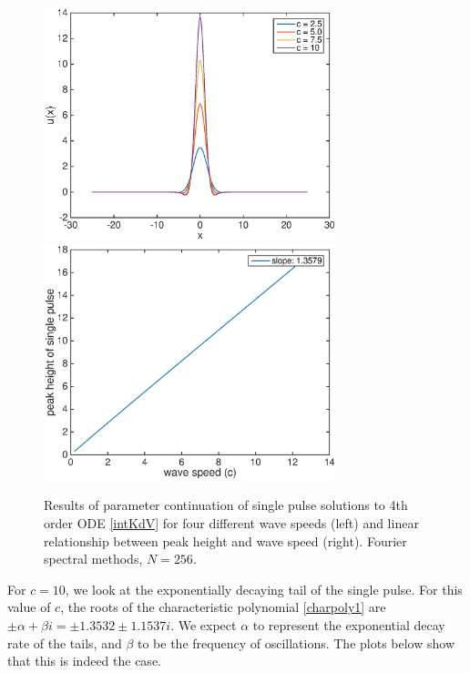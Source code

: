 \documentclass[12pt]{article}
\begin{document}
\begin{figure}[H]
	\includegraphics[width=8.5cm]{continuation.eps}
	\includegraphics[width=8.5cm]{heightvsspeed.eps}
	\caption{Results of parameter continuation of single pulse solutions to 4th order ODE \eqref{intKdV} for four different wave speeds (left) and linear relationship between peak height and wave speed (right). Fourier spectral methods, $N = 256$.}
\end{figure}

For $c = 10$, we look at the exponentially decaying tail of the single pulse. For this value of $c$, the roots of the characteristic polynomial \eqref{charpoly1} are $\pm \alpha + \beta i = \pm1.3532 \pm 1.1537i$. We expect $\alpha$ to represent the exponential decay rate of the tails, and $\beta$ to be the frequency of oscillations. The plots below show that this is indeed the case.
\end{document}
